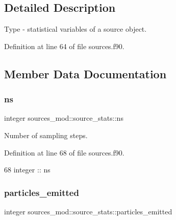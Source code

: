 \subsection{Detailed Description}
Type -\/ statistical variables of a source object. 

Definition at line 64 of file sources.\+f90.



\subsection{Member Data Documentation}
\mbox{\label{structsources__mod_1_1source__stats_a77ba33fcefa55c8d8e440844ee7f4640}} 
\subsubsection{\texorpdfstring{ns}{ns}}
{\footnotesize\ttfamily integer sources\+\_\+mod\+::source\+\_\+stats\+::ns\hspace{0.3cm}{\ttfamily [private]}}



Number of sampling steps. 



Definition at line 68 of file sources.\+f90.


\begin{DoxyCode}
68         \textcolor{keywordtype}{integer} :: ns
\end{DoxyCode}
\mbox{\label{structsources__mod_1_1source__stats_a2253ced036ad1a9fee933b6b08135189}} 
\subsubsection{\texorpdfstring{particles\+\_\+emitted}{particles\_emitted}}
{\footnotesize\ttfamily integer sources\+\_\+mod\+::source\+\_\+stats\+::particles\+\_\+emitted\hspace{0.3cm}{\ttfamily [private]}}



